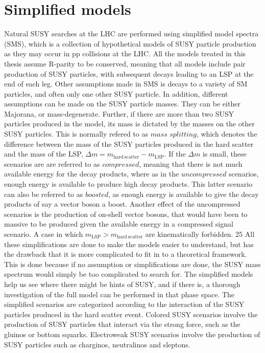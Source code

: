 \section{Simplified models}
\noindent\justify
Natural SUSY searches at the LHC are performed using simplified model spectra (SMS), which is a collection of hypothetical models of SUSY particle production as they may occur in pp collisions at the LHC.
All the models treated in this thesis assume R-parity to be conserved, meaning that all models include pair production of SUSY particles, with subsequent decays leading to an LSP at the end of each leg.
Other assumptions made in SMS is decays to a variety of SM particles, and often only one other SUSY particle.
In addition, different assumptions can be made on the SUSY particle masses. They can be either Majorana, or mass-degenerate. 
Further, if there are more than two SUSY particles produced in the model, its mass is dictated by the masses on the other SUSY particles. 
This is normally refered to as $mass$ $splitting$, which denotes the difference between the mass of the SUSY particles produced in the hard scatter and the mass of the LSP, $\Delta m = m_{\mathrm{hard\,scatter}}-m_{\mathrm{LSP}}$.
If the $\Delta m$ is small, these scenarios are are referred to as $compressed$, meaning that there is not much available energy for the decay products, where as in the $uncompressed$ scenarios, enough energy is available to produce high \pt decay products. 
This latter scenario can also be referred to as $boosted$, as enough energy is available to give the decay products of say a vector boson a boost.   
Another effect of the uncompressed scenarios is the production of on-shell vector bosons, that would have been to massive to be produced given the available energy in a compressed signal scenario. 
A case in which $m_{\mathrm{LSP}}>m_{\mathrm{hard\,scatter}}$ are kinematically forbidden.  25 All these simplifications are done to make the models easier to understand, but has the drawback that it is more complicated to fit in to a theoretical framework.
This is done because if no assumption or simplifications are done, the SUSY mass spectrum would simply be too complicated to search for. 
The simplified models help us see where there might be hints of SUSY, and if there is, a thorough investigation of the full model can be performed in that phase space. 
The simplified scenarios are categorized according to the interaction of the SUSY particles produced in the  hard scatter event. 
Colored SUSY scenarios involve the production of SUSY particles that interact via the strong force, such as the gluinos or bottom squarks. 
Electroweak SUSY scenarios involve the production of SUSY particles such as charginos, neutralinos and sleptons. 
